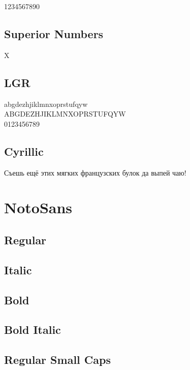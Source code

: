 \documentclass{article}
\begin{document}
1234567890

\subsection*{Superior Numbers}

X


\subsection*{LGR}

{\notoseriflgr\noindent
abgdezhjiklmnxoprstufqyw\\
ABGDEZHJIKLMNXOPRSTUFQYW\\
0123456789
}

\subsection*{Cyrillic}

{\ifxetex\else\ifluatex\else{}\selectfont\fi\fi
Съешь ещё этих мягких французских булок да
выпей чаю!}

\section*{NotoSans}

\sffamily

\subsection*{Regular}
\lipsum[1]

\subsection*{Italic}
\textit{\lipsum[2]}

\subsection*{Bold}

\textbf{\lipsum[3]}



\subsection*{Bold Italic}

\textbf{\textit{\lipsum[4]}}

\subsection*{Regular Small Caps}
\textsc{\lipsum[1]}
\end{document}
